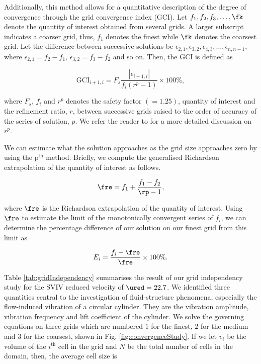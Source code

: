 \documentclass[a4paper,fleqn]{cas-sc}
\begin{document}
Additionally, this method allows for a quantitative description of the degree of convergence through the grid convergence index (GCI). Let $f_{1},f_{2},f_{3},\dots,\fk$ denote the quantity of interest obtained from several grids. A larger subscript indicates a coarser grid, thus, $f_{1}$ denotes the finest while $\fk$ denotes the coarsest grid. Let the difference between successive solutions be $\epsilon_{2,1},\epsilon_{3,2},\epsilon_{4,3},\dots,\epsilon_{n,n-1}$, where $\epsilon_{2,1} = f_{2} - f_{1}$, $\epsilon_{3,2} = f_{3} - f_{2}$ and so on. Then, the GCI is defined as

\begin{equation}
  \text{GCI}_{i+1,i} = F_{s} \frac{\left |\epsilon_{i+1,i} \right |}{f_{i} \left ( r^{p} - 1 \right )} \times 100\%,
  \label{eq:gci}
\end{equation}

\noindent where $F_{s}$, $f_{i}$ and $r^{p}$ denotes the safety factor $\left ( = 1.25 \right )$, quantity of interest and the refinement ratio, $r$, between successive grids raised to the order of accuracy of the series of solution, $p$. We refer the reader to \citet{Stern2001,Langley2018} for a more detailed discussion on $r^{p}$.

We can estimate what the solution approaches as the grid size approaches zero by using the $\text{p}^{\text{th}}$ method. Briefly, we compute the generalised Richardson extrapolation of the quantity of interest as follows.

\begin{equation}
  \fre = f_{1} + \frac{f_{1} - f_{2}}{\rp - 1},
  \label{eq:richardsonExtrapolation}
\end{equation}

\noindent where $\fre$ is the Richardson extrapolation of the quantity of interest. Using $\fre$ to estimate the limit of the monotonically convergent series of $f_{i}$, we can determine the percentage difference of our solution on our finest grid from this limit as

\begin{equation}
  E_{i} = \frac{f_{i} - \fre}{\fre} \times 100\%.
  \label{eq:percentageDifference}
\end{equation}

Table \ref{tab:gridIndependency} summarises the result of our grid independency study for the SVIV reduced velocity of $\ured = 22.7$. We identified three quantities central to the investigation of fluid-structure phenomena, especially the flow-induced vibration of a circular cylinder. They are the vibration amplitude, vibration frequency and lift coefficient of the cylinder. We solve the governing equations on three grids which are numbered $1$ for the finest, $2$ for the medium and $3$ for the coarsest, shown in Fig. \ref{fig:convergenceStudy}. If we let $v_{i}$ be the volume of the $i^{\text{th}}$ cell in the grid and $N$ be the total number of cells in the domain, then, the average cell size is
\end{document}
